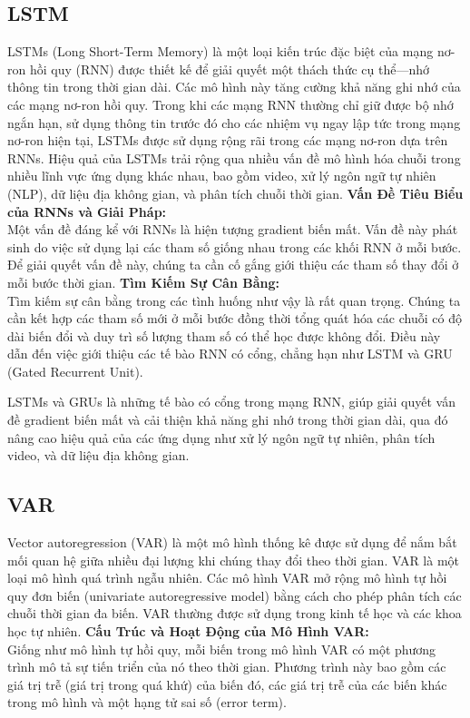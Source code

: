 \documentclass[conference]{IEEEtran}
\begin{document}
	\subsection{LSTM}
	LSTMs (Long Short-Term Memory) là một loại kiến trúc đặc biệt của mạng nơ-ron hồi quy (RNN) được thiết kế để giải quyết một thách thức cụ thể—nhớ thông tin trong thời gian dài. Các mô hình này tăng cường khả năng ghi nhớ của các mạng nơ-ron hồi quy. Trong khi các mạng RNN thường chỉ giữ được bộ nhớ ngắn hạn, sử dụng thông tin trước đó cho các nhiệm vụ ngay lập tức trong mạng nơ-ron hiện tại, LSTMs được sử dụng rộng rãi trong các mạng nơ-ron dựa trên RNNs. Hiệu quả của LSTMs trải rộng qua nhiều vấn đề mô hình hóa chuỗi trong nhiều lĩnh vực ứng dụng khác nhau, bao gồm video, xử lý ngôn ngữ tự nhiên (NLP), dữ liệu địa không gian, và phân tích chuỗi thời gian.
	\textbf{Vấn Đề Tiêu Biểu của RNNs và Giải Pháp:}\\
	Một vấn đề đáng kể với RNNs là hiện tượng gradient biến mất. Vấn đề này phát sinh do việc sử dụng lại các tham số giống nhau trong các khối RNN ở mỗi bước. Để giải quyết vấn đề này, chúng ta cần cố gắng giới thiệu các tham số thay đổi ở mỗi bước thời gian.
	\textbf{Tìm Kiếm Sự Cân Bằng:}\\
	Tìm kiếm sự cân bằng trong các tình huống như vậy là rất quan trọng. Chúng ta cần kết hợp các tham số mới ở mỗi bước đồng thời tổng quát hóa các chuỗi có độ dài biến đổi và duy trì số lượng tham số có thể học được không đổi. Điều này dẫn đến việc giới thiệu các tế bào RNN có cổng, chẳng hạn như LSTM và GRU (Gated Recurrent Unit).
	
	LSTMs và GRUs là những tế bào có cổng trong mạng RNN, giúp giải quyết vấn đề gradient biến mất và cải thiện khả năng ghi nhớ trong thời gian dài, qua đó nâng cao hiệu quả của các ứng dụng như xử lý ngôn ngữ tự nhiên, phân tích video, và dữ liệu địa không gian.
	\subsection{VAR}
	Vector autoregression (VAR) là một mô hình thống kê được sử dụng để nắm bắt mối quan hệ giữa nhiều đại lượng khi chúng thay đổi theo thời gian. VAR là một loại mô hình quá trình ngẫu nhiên. Các mô hình VAR mở rộng mô hình tự hồi quy đơn biến (univariate autoregressive model) bằng cách cho phép phân tích các chuỗi thời gian đa biến. VAR thường được sử dụng trong kinh tế học và các khoa học tự nhiên.
	\textbf{Cấu Trúc và Hoạt Động của Mô Hình VAR:}\\
	Giống như mô hình tự hồi quy, mỗi biến trong mô hình VAR có một phương trình mô tả sự tiến triển của nó theo thời gian. Phương trình này bao gồm các giá trị trễ (giá trị trong quá khứ) của biến đó, các giá trị trễ của các biến khác trong mô hình và một hạng tử sai số (error term).
	
\end{document}

